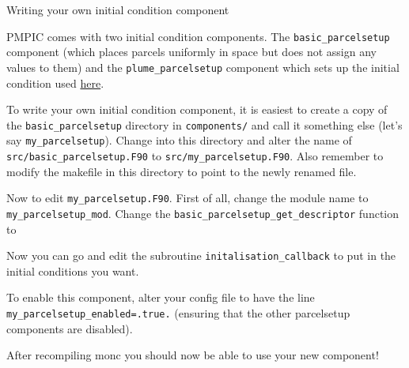 \documentclass{beamer}
\newenvironment{Shaded}{}{}
\newcommand{\KeywordTok}[1]{\textcolor[rgb]{0.13,0.29,0.53}{\textbf{{#1}}}}
\newcommand{\DataTypeTok}[1]{\textcolor[rgb]{0.13,0.29,0.53}{{#1}}}
\newcommand{\FloatTok}[1]{\textcolor[rgb]{0.00,0.00,0.81}{{#1}}}
\newcommand{\StringTok}[1]{\textcolor[rgb]{0.31,0.60,0.02}{{#1}}}
\newcommand{\OperatorTok}[1]{\textcolor[rgb]{0.81,0.36,0.00}{\textbf{{#1}}}}
\newcommand{\NormalTok}[1]{{#1}}
\begin{document}
\begin{frame}[fragile]{Writing your own initial condition component}
\protect\hypertarget{writing-your-own-initial-condition-component}{}

PMPIC comes with two initial condition components. The
\texttt{basic\_parcelsetup} component (which places parcels uniformly in
space but does not assign any values to them) and the
\texttt{plume\_parcelsetup} component which sets up the initial
condition used
\href{https://rmets.onlinelibrary.wiley.com/doi/10.1002/qj.3319}{here}.

To write your own initial condition component, it is easiest to create a
copy of the \texttt{basic\_parcelsetup} directory in
\texttt{components/} and call it something else (let's say
\texttt{my\_parcelsetup}). Change into this directory and alter the name
of \texttt{src/basic\_parcelsetup.F90} to
\texttt{src/my\_parcelsetup.F90}. Also remember to modify the makefile
in this directory to point to the newly renamed file.

Now to edit \texttt{my\_parcelsetup.F90}. First of all, change the
module name to \texttt{my\_parcelsetup\_mod}. Change the
\texttt{basic\_parcelsetup\_get\_descriptor} function to

\begin{Shaded}
\end{Shaded}

Now you can go and edit the subroutine \texttt{initalisation\_callback}
to put in the initial conditions you want.

To enable this component, alter your config file to have the line
\texttt{my\_parcelsetup\_enabled=.true.} (ensuring that the other
parcelsetup components are disabled).

After recompiling monc you should now be able to use your new component!

\end{frame}
\end{document}
